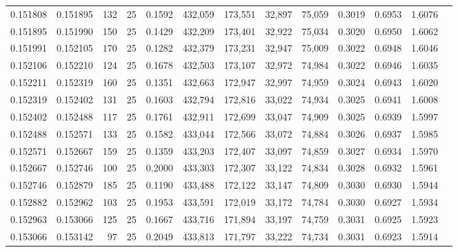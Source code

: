 \begin{tabular}{rrrrrrrrrrrrr}
0.151808 & 0.151895 &   132 &  25 &                                     0.1592 & 432,059 & 173,551 &  32,897 &  75,059 & 0.3019 & 0.6953 & 1.6076 \\
0.151895 & 0.151990 &   150 &  25 &                                     0.1429 & 432,209 & 173,401 &  32,922 &  75,034 & 0.3020 & 0.6950 & 1.6062 \\
0.151991 & 0.152105 &   170 &  25 &                                     0.1282 & 432,379 & 173,231 &  32,947 &  75,009 & 0.3022 & 0.6948 & 1.6046 \\
0.152106 & 0.152210 &   124 &  25 &                                     0.1678 & 432,503 & 173,107 &  32,972 &  74,984 & 0.3022 & 0.6946 & 1.6035 \\
0.152211 & 0.152319 &   160 &  25 &                                     0.1351 & 432,663 & 172,947 &  32,997 &  74,959 & 0.3024 & 0.6943 & 1.6020 \\
0.152319 & 0.152402 &   131 &  25 &                                     0.1603 & 432,794 & 172,816 &  33,022 &  74,934 & 0.3025 & 0.6941 & 1.6008 \\
0.152402 & 0.152488 &   117 &  25 &                                     0.1761 & 432,911 & 172,699 &  33,047 &  74,909 & 0.3025 & 0.6939 & 1.5997 \\
0.152488 & 0.152571 &   133 &  25 &                                     0.1582 & 433,044 & 172,566 &  33,072 &  74,884 & 0.3026 & 0.6937 & 1.5985 \\
0.152571 & 0.152667 &   159 &  25 &                                     0.1359 & 433,203 & 172,407 &  33,097 &  74,859 & 0.3027 & 0.6934 & 1.5970 \\
0.152667 & 0.152746 &   100 &  25 &                                     0.2000 & 433,303 & 172,307 &  33,122 &  74,834 & 0.3028 & 0.6932 & 1.5961 \\
0.152746 & 0.152879 &   185 &  25 &                                     0.1190 & 433,488 & 172,122 &  33,147 &  74,809 & 0.3030 & 0.6930 & 1.5944 \\
0.152882 & 0.152962 &   103 &  25 &                                     0.1953 & 433,591 & 172,019 &  33,172 &  74,784 & 0.3030 & 0.6927 & 1.5934 \\
0.152963 & 0.153066 &   125 &  25 &                                     0.1667 & 433,716 & 171,894 &  33,197 &  74,759 & 0.3031 & 0.6925 & 1.5923 \\
0.153066 & 0.153142 &    97 &  25 &                                     0.2049 & 433,813 & 171,797 &  33,222 &  74,734 & 0.3031 & 0.6923 & 1.5914 \\

\end{tabular}
